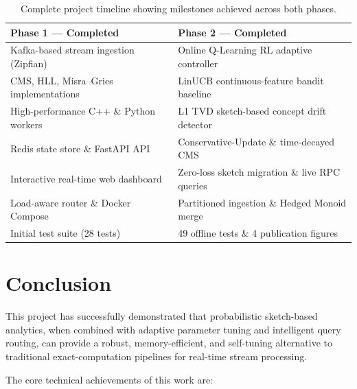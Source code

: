 \begin{table}[H]
\centering
\renewcommand{\arraystretch}{1.3}
\begin{tabular}{p{} p{}}
\toprule
\textbf{Phase 1 — Completed} & \textbf{Phase 2 — Completed} \\
\midrule
Kafka-based stream ingestion (Zipfian)     & Online Q-Learning RL adaptive controller \\
CMS, HLL, Misra--Gries implementations    & LinUCB continuous-feature bandit baseline \\
High-performance C++ \& Python workers     & L1 TVD sketch-based concept drift detector \\
Redis state store \& FastAPI API           & Conservative-Update \& time-decayed CMS \\
Interactive real-time web dashboard        & Zero-loss sketch migration \& live RPC queries \\
Load-aware router \& Docker Compose        & Partitioned ingestion \& Hedged Monoid merge \\
Initial test suite (28 tests)             & 49 offline tests \& 4 publication figures \\
\bottomrule
\end{tabular}
\caption{Complete project timeline showing milestones achieved across both phases.}
\label{tab:project_timeline}
\end{table}


\section{Conclusion}

This project has successfully demonstrated that probabilistic sketch-based analytics, when combined with adaptive parameter tuning and intelligent query routing, can provide a robust, memory-efficient, and self-tuning alternative to traditional exact-computation pipelines for real-time stream processing.

The core technical achievements of this work are:

